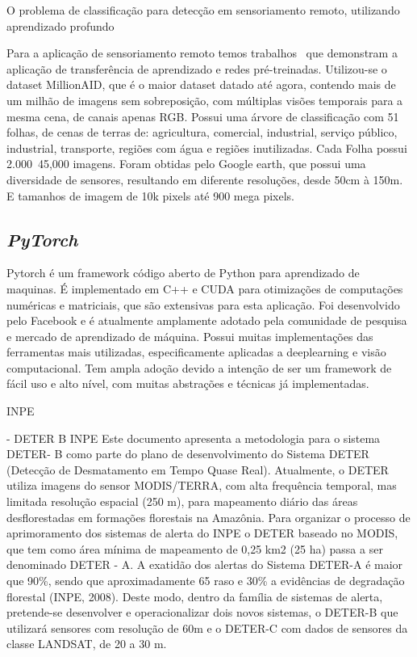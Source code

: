 O problema de classificação para detecção em sensoriamento remoto, utilizando aprendizado profundo~\cite{s20236936}





Para a aplicação de sensoriamento remoto temos trabalhos~\cite{wang2022empirical} que demonstram a aplicação de transferência de aprendizado e redes pré-treinadas. Utilizou-se o dataset MillionAID, que é o maior dataset datado até agora, contendo mais de um milhão de imagens sem sobreposição, com múltiplas visões temporais para a mesma cena, de canais apenas RGB. Possui uma árvore de classificação com 51 folhas, de cenas de terras de: agricultura, comercial, industrial, serviço público, industrial, transporte, regiões com água e regiões inutilizadas. Cada Folha possui 2.000~45,000 imagens. Foram obtidas pelo Google earth, que possui uma diversidade de sensores, resultando em diferente resoluções, desde 50cm à 150m. E tamanhos de imagem de 10k pixels até 900 mega pixels.




\subsection{\textit{PyTorch}}\label{sec:Cap2_PyTorch}
Pytorch é um framework código aberto de Python para aprendizado de maquinas. É implementado em C++ e CUDA para otimizações de computações numéricas e matriciais, que são extensivas para esta aplicação.
Foi desenvolvido pelo Facebook e é atualmente amplamente adotado pela comunidade de pesquisa e mercado de aprendizado de máquina. Possui muitas implementações das ferramentas mais utilizadas, especificamente aplicadas a deeplearning e visão computacional. Tem ampla adoção devido a intenção de ser um framework de fácil uso e alto nível, com muitas abstrações e técnicas já implementadas.



INPE


- DETER B INPE Este documento apresenta a metodologia para o sistema DETER- B como parte
do plano de desenvolvimento do Sistema DETER (Detecção de Desmatamento em
Tempo Quase Real). Atualmente, o DETER utiliza imagens do sensor MODIS/TERRA,
com alta frequência temporal, mas limitada resolução espacial (250 m), para
mapeamento diário das áreas desflorestadas em formações florestais na Amazônia.
Para organizar o processo de aprimoramento dos sistemas de alerta do INPE o DETER
baseado no MODIS, que tem como área mínima de mapeamento de 0,25 km2 (25 ha)
passa a ser denominado DETER - A. A exatidão dos alertas do Sistema DETER-A é maior
que 90\%, sendo que aproximadamente 65%
raso e 30\% a evidências de degradação florestal (INPE, 2008).
Deste modo, dentro da família de sistemas de alerta, pretende-se desenvolver e
operacionalizar dois novos sistemas, o DETER-B que utilizará sensores com resolução
de 60m e o DETER-C com dados de sensores da classe LANDSAT, de 20 a 30 m.


